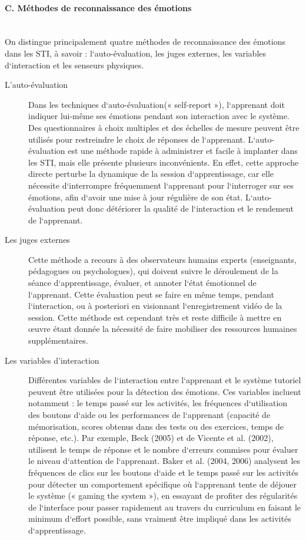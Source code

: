 \paragraph{C. Méthodes de reconnaissance des émotions}\mbox{}\\
On distingue principalement quatre méthodes de reconnaissance des émotions dans les STI, à
savoir : l‘auto-évaluation, les juges externes, les variables d‘interaction et les senseurs
physiques.\cite{jraidi_2013}
\begin{description}
    \item[L’auto-évaluation] Dans les techniques d‘auto-évaluation(« self-report »), l‘apprenant doit indiquer lui-même ses émotions pendant son interaction avec le système. Des questionnaires à choix multiples et des échelles de mesure peuvent être utilisés pour restreindre le choix de réponses de l‘apprenant. L‘auto-évaluation est une méthode rapide à administrer et facile à implanter dans les STI, mais elle présente plusieurs inconvénients. En effet, cette approche directe perturbe la dynamique de la session d‘apprentissage, car elle nécessite d‘interrompre fréquemment l‘apprenant pour l‘interroger sur ses émotions, afin d‘avoir une mise à jour régulière de son état. L‘auto-évaluation peut donc détériorer la qualité de l‘interaction et le rendement de l‘apprenant.
    \item[Les juges externes] Cette méthode a recours à des observateurs humains experts (enseignants, pédagogues ou psychologues), qui doivent suivre le déroulement de la séance d‘apprentissage, évaluer, et annoter l‘état émotionnel de l‘apprenant. Cette évaluation peut se faire en même temps, pendant l‘interaction, ou à posteriori en visionnant l‘enregistrement vidéo de la session. Cette méthode est cependant très  et reste difficile à mettre en œuvre étant donnée la nécessité de faire mobiliser des ressources humaines supplémentaires.
    \item[Les variables d’interaction]
    Différentes variables de l‘interaction entre l‘apprenant et le système tutoriel peuvent être utilisées pour la détection des émotions. Ces variables incluent notamment : le temps passé sur les activités, les fréquences d‘utilisation des boutons d‘aide ou les performances de l‘apprenant (capacité de mémorisation, scores obtenus dans des tests ou des exercices, temps de réponse, etc.). Par exemple, Beck (2005) et de Vicente et al. (2002), utilisent le temps de réponse et le nombre d‘erreurs commises pour évaluer le niveau d‘attention de l‘apprenant. Baker et al. (2004, 2006) analysent les fréquences de clics sur les boutons d‘aide et le temps passé sur les activités pour détecter un comportement spécifique où l‘apprenant tente de déjouer le système (« gaming the system »), en essayant de profiter des régularités de l‘interface pour passer rapidement au travers du curriculum en faisant le minimum d‘effort possible, sans vraiment être impliqué dans les activités d‘apprentissage.

\end{description}
